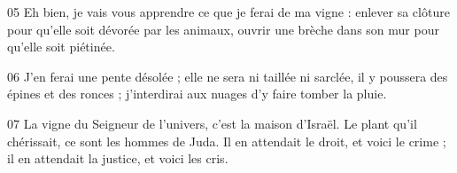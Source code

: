 
05 Eh bien, je vais vous apprendre ce que je ferai de ma vigne : enlever sa clôture pour qu’elle soit dévorée par les animaux, ouvrir une brèche dans son mur pour qu’elle soit piétinée.

06 J’en ferai une pente désolée ; elle ne sera ni taillée ni sarclée, il y poussera des épines et des ronces ; j’interdirai aux nuages d’y faire tomber la pluie.

07 La vigne du Seigneur de l’univers, c’est la maison d’Israël. Le plant qu’il chérissait, ce sont les hommes de Juda. Il en attendait le droit, et voici le crime ; il en attendait la justice, et voici les cris.